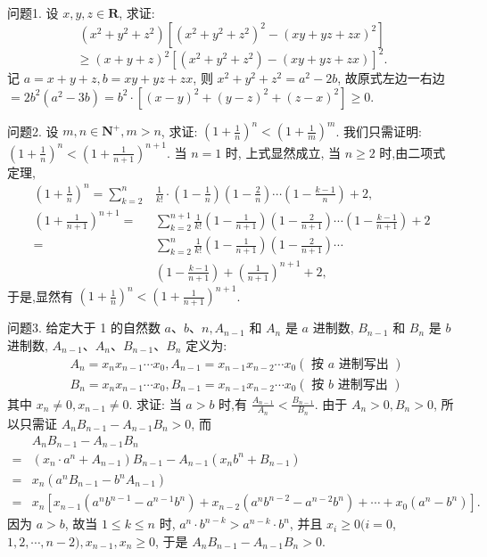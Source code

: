 
问题1. 设 $x, y, z \in \mathbf{R}$, 求证:
$$
\left(x^2+y^2+z^2\right)\left[\left(x^2+y^2+z^2\right)^2-(x y+y z+z x)^2\right]
$$
$$
\geqslant(x+y+z)^2\left[\left(x^2+y^2+z^2\right)-(x y+y z+z x)\right]^2 .
$$
记 $a=x+y+z, b=x y+y z+z x$, 则 $x^2+y^2+z^2=a^2-2 b$, 故原式左边一右边 $=2 b^2\left(a^2-3 b\right)=b^2 \cdot\left[(x-y)^2+(y-z)^2+(z-x)^2\right] \geqslant 0$.



问题2. 设 $m, n \in \mathbf{N}^{+}, m>n$, 求证: $\left(1+\frac{1}{n}\right)^n<\left(1+\frac{1}{m}\right)^m$.
我们只需证明: $\left(1+\frac{1}{n}\right)^n<\left(1+\frac{1}{n+1}\right)^{n+1}$.
当 $n=1$ 时, 上式显然成立, 当 $n \geqslant 2$ 时,由二项式定理,
$$
\begin{aligned}
\left(1+\frac{1}{n}\right)^n=\sum_{k=2}^n & \frac{1}{k !} \cdot\left(1-\frac{1}{n}\right)\left(1-\frac{2}{n}\right) \cdots\left(1-\frac{k-1}{n}\right)+2, \\
\left(1+\frac{1}{n+1}\right)^{n+1}= & \sum_{k=2}^{n+1} \frac{1}{k !}\left(1-\frac{1}{n+1}\right)\left(1-\frac{2}{n+1}\right) \cdots\left(1-\frac{k-1}{n+1}\right)+2 \\
= & \sum_{k=2}^n \frac{1}{k !}\left(1-\frac{1}{n+1}\right)\left(1-\frac{2}{n+1}\right) \cdots \\
& \left(1-\frac{k-1}{n+1}\right)+\left(\frac{1}{n+1}\right)^{n+1}+2,
\end{aligned}
$$
于是,显然有 $\left(1+\frac{1}{n}\right)^n<\left(1+\frac{1}{n+1}\right)^{n+1}$.



问题3. 给定大于 1 的自然数 $a 、 b 、 n, A_{n-1}$ 和 $A_n$ 是 $a$ 进制数, $B_{n-1}$ 和 $B_n$ 是 $b$ 进制数, $A_{n-1} 、 A_n 、 B_{n-1} 、 B_n$ 定义为:
$$
\begin{aligned}
& A_n=x_n x_{n-1} \cdots x_0, A_{n-1}=x_{n-1} x_{n-2} \cdots x_0(\text { 按 } a \text { 进制写出 }) \\
& B_n=x_n x_{n-1} \cdots x_0, B_{n-1}=x_{n-1} x_{n-2} \cdots x_0(\text { 按 } b \text { 进制写出 })
\end{aligned}
$$
其中 $x_n \neq 0, x_{n-1} \neq 0$. 求证: 当 $a>b$ 时,有 $\frac{A_{n-1}}{A_n}<\frac{B_{n-1}}{B_n}$.
由于 $A_n>0, B_n>0$, 所以只需证 $A_n B_{n-1}-A_{n-1} B_n>0$, 而
$$
\begin{aligned}
& A_n B_{n-1}-A_{n-1} B_n \\
= & \left(x_n \cdot a^n+A_{n-1}\right) B_{n-1}-A_{n-1}\left(x_n b^n+B_{n-1}\right) \\
= & x_n\left(a^n B_{n-1}-b^n A_{n-1}\right) \\
= & x_n\left[x_{n-1}\left(a^n b^{n-1}-a^{n-1} b^n\right)+x_{n-2}\left(a^n b^{n-2}-a^{n-2} b^n\right)+\cdots+x_0\left(a^n-b^n\right)\right] .
\end{aligned}
$$
因为 $a>b$, 故当 $1 \leqslant k \leqslant n$ 时, $a^n \cdot b^{n-k}>a^{n-k} \cdot b^n$, 并且 $x_i \geqslant 0(i=0$, $1,2, \cdots, n-2), x_{n-1}, x_n \geqslant 0$, 于是 $A_n B_{n-1}-A_{n-1} B_n>0$.



